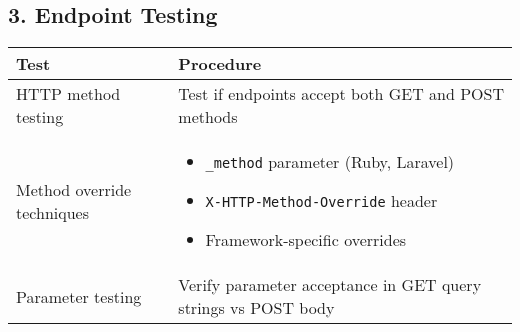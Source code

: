 \documentclass{article}
\begin{document}
\subsection*{3. Endpoint Testing}
\begin{tabular}{>{\raggedright\arraybackslash}p{}>{\raggedright\arraybackslash}p{}}
    \toprule
    \textbf{Test} & \textbf{Procedure} \\
    \midrule
    HTTP method testing & Test if endpoints accept both GET and POST methods \\
    Method override techniques & 
    \begin{itemize}
        \setlength\itemsep{0em}
        \item \texttt{\_method} parameter (Ruby, Laravel)
        \item \texttt{X-HTTP-Method-Override} header
        \item Framework-specific overrides
    \end{itemize} \\
    Parameter testing & Verify parameter acceptance in GET query strings vs POST body \\
    \bottomrule
\end{tabular}
\end{document}
